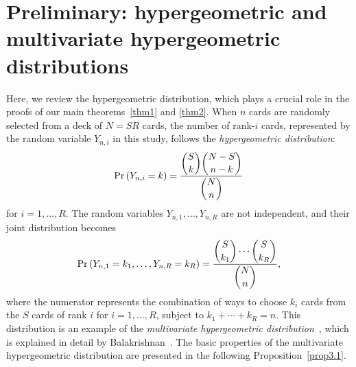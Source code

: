 \documentclass[pre, amsmath, floatfix]{revtex4-2}
\theoremstyle{plain}
\theoremstyle{definition}
\theoremstyle{remark}
\newcommand{\Prob}[1]{\mathrm{Pr}\left(#1\right)} %
\begin{document}
\section{Preliminary: hypergeometric and multivariate hypergeometric distributions}
Here, we review the hypergeometric distribution, which plays a crucial role in the proofs of our main theorems~\ref{thm1} and \ref{thm2}.
When $n$ cards are randomly selected from a deck of $N=SR$ cards, the number of rank-$i$ cards, represented by the random variable $Y_{n,i}$ in this study, follows the \emph{hypergeometric distribution}:
\begin{equation}
\Prob{Y_{n,i}=k}=\dfrac{\dbinom{S}{k}\dbinom{N-S}{n-k}}{\dbinom{N}{n}}
\label{eq:hg_pmf}
\end{equation}
for $i=1,\ldots,R$.
The random variables $Y_{n,1},\ldots, Y_{n,R}$ are not independent, and their joint distribution becomes
\[
\Prob{Y_{n,1}=k_1,\ldots,Y_{n,R}=k_R}=\frac{\dbinom{S}{k_1}\cdots\dbinom{S}{k_R}}{\dbinom{N}{n}},
\]
where the numerator represents the combination of ways to choose $k_i$ cards from the $S$ cards of rank $i$ for $i=1,\ldots,R$, subject to $k_1+\cdots+k_R=n$.
This distribution is an example of the \emph{multivariate hypergeometric distribution}~\cite{Bishop}, which is explained in detail by Balakrishnan~\cite{Balakrishnan}.
The basic properties of the multivariate hypergeometric distribution are presented in the following Proposition~\ref{prop3.1}.
\end{document}
